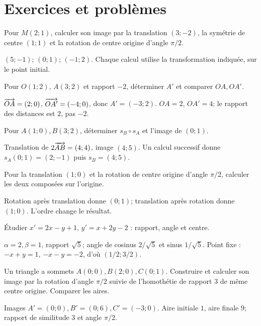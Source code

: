 \section{Exercices et problèmes}
\exo[Images]\label{t11s-c15-e01}
Pour $M(2;1)$, calculer son image par la translation $(3;-2)$, la symétrie de centre $(1;1)$ et la rotation de centre origine d’angle $\pi/2$.
\begin{corrige}\label{sol-t11s-c15-e01}
$(5;-1)$; $(0;1)$; $(-1;2)$. Chaque calcul utilise la transformation indiquée, sur le point initial.
\end{corrige}
\label{t11s-c15-e02}
Pour $O(1;2)$, $A(3;2)$ et rapport $-2$, déterminer $A'$ et comparer $OA,OA'$.
\begin{corrige}\label{sol-t11s-c15-e02}
$\overrightarrow{OA}=(2;0)$, $\overrightarrow{OA'}=(-4;0)$, donc $A'=(-3;2)$. $OA=2$, $OA'=4$; le rapport des distances est $2$, pas $-2$.
\end{corrige}
\label{t11s-c15-e03}
Pour $A(1;0),B(3;2)$, déterminer $s_B\circ s_A$ et l’image de $(0;1)$.
\begin{corrige}\label{sol-t11s-c15-e03}
Translation de $2\overrightarrow{AB}=(4;4)$, image $(4;5)$. Un calcul successif donne $s_A(0;1)=(2;-1)$ puis $s_B=(4;5)$.
\end{corrige}
\label{t11s-c15-e04}
Pour la translation $(1;0)$ et la rotation de centre origine d’angle $\pi/2$, calculer les deux composées sur l’origine.
\begin{corrige}\label{sol-t11s-c15-e04}
Rotation après translation donne $(0;1)$; translation après rotation donne $(1;0)$. L’ordre change le résultat.
\end{corrige}
\label{t11s-c15-e05}
Étudier $x'=2x-y+1$, $y'=x+2y-2$ : rapport, angle et centre.
\begin{corrige}\label{sol-t11s-c15-e05}
$\alpha=2,\beta=1$, rapport $\sqrt5$; angle de cosinus $2/\sqrt5$ et sinus $1/\sqrt5$. Point fixe : $-x+y=1$, $-x-y=-2$, d’où $(1/2;3/2)$.
\end{corrige}
\label{t11s-c15-e06}
Un triangle a sommets $A(0;0),B(2;0),C(0;1)$. Construire et calculer son image par la rotation d’angle $\pi/2$ suivie de l’homothétie de rapport $3$ de même centre origine. Comparer les aires.
\begin{corrige}\label{sol-t11s-c15-e06}
Images $A'=(0;0),B'=(0;6),C'=(-3;0)$. Aire initiale $1$, aire finale $9$; rapport de similitude $3$ et angle $\pi/2$.
\end{corrige}

